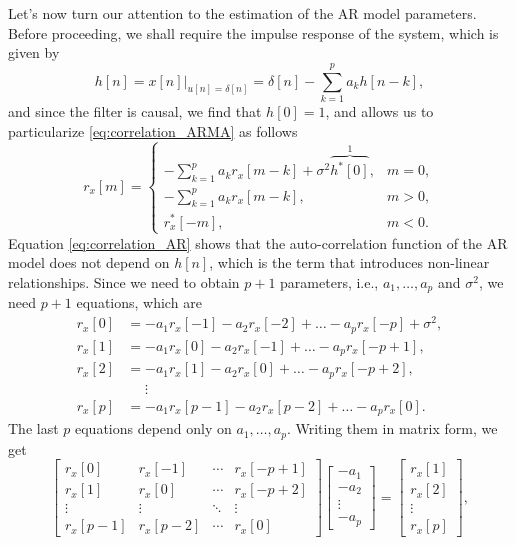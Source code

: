 Let's now turn our attention to the estimation of the AR model parameters. Before proceeding, we shall require the impulse response of the system, which is given by
\begin{equation}
h[n] = \left.x[n]\right|_{u[n] = \delta[n]} = \delta[n] - \sum_{k = 1}^{p} a_k h[n -k],
\end{equation}
and since the filter is causal, we find that $h[0] = 1$, and allows us to particularize \eqref{eq:correlation_ARMA} as follows
\begin{equation}
\label{eq:correlation_AR}
r_{x}[m] = \begin{cases}
\displaystyle - \sum_{k = 1}^{p} a_k r_{x}[m-k] + \sigma^2  \overbrace{h^{\ast}[0]}^1, & m = 0, \\ 
\displaystyle  - \sum_{k = 1}^{p} a_k r_{x}[m-k], & m > 0, \\
r_{x}^{\ast}[-m], & m < 0.
\end{cases}
\end{equation}
Equation \eqref{eq:correlation_AR} shows that the auto-correlation function of the AR model does not depend on $h[n]$, which is the term that introduces non-linear relationships. Since we need to obtain $p+1$ parameters, i.e., $a_1, \ldots, a_p$ and $\sigma^2$, we need $p+1$ equations, which are
\begin{align*}
r_x[0] &= -a_1 r_x[-1] - a_2 r_x[-2] + \ldots -a_p r_x[-p] + \sigma^2, \\
r_x[1] &= -a_1 r_x[0] - a_2 r_x[-1] + \ldots -a_p r_x[-p+1], \\
r_x[2] &= -a_1 r_x[1] - a_2 r_x[0] + \ldots -a_p r_x[-p+2], \\
	&\phantom{=} \vdots \\
r_x[p] &= -a_1 r_x[p-1] - a_2 r_x[p-2] + \ldots -a_p r_x[0].
\end{align*}
The last $p$ equations depend only on $a_1, \ldots, a_p$. Writing them in matrix form, we get
\begin{equation}
\begin{bmatrix}
r_x[0] & r_x[-1] & \cdots & r_x[-p+1] \\
r_x[1] & r_x[0] & \cdots & r_x[-p+2] \\
\vdots & \vdots & \ddots & \vdots \\
r_x[p-1] & r_x[p-2] & \cdots & r_x[0] 
\end{bmatrix}
\begin{bmatrix}
-a_1 \\ -a_2 \\ \vdots \\ -a_p
\end{bmatrix} = 
\begin{bmatrix}
r_x[1] \\ r_x[2] \\ \vdots \\ r_x[p]
\end{bmatrix},
\end{equation}
